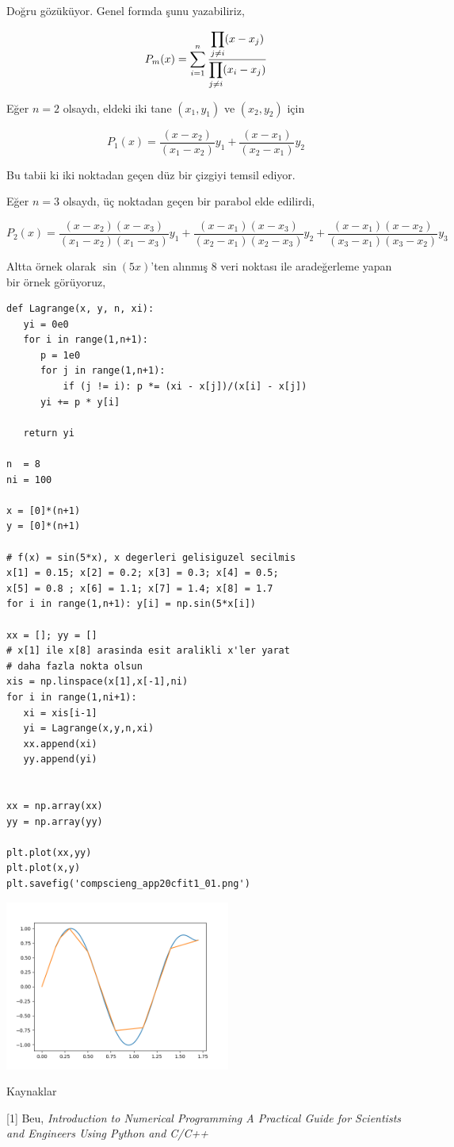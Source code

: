 \documentclass[12pt,fleqn]{article}\usepackage{../../common}
\begin{document}
Doğru gözüküyor. Genel formda şunu yazabiliriz,

$$
P_m (x) = \sum_{i=1}^{n}
\frac{\displaystyle \prod_{j \ne i} (x - x_j)}{\displaystyle \prod_{j \ne i} (x_i - x_j)}
$$

Eğer $n=2$ olsaydı, eldeki iki tane $(x_1,y_1)$ ve $(x_2,y_2)$ için

$$
P_1(x) =
\frac{(x-x_2)}{(x_1-x_2)} y_1 +
\frac{(x-x_1)}{(x_2-x_1)} y_2 
$$

Bu tabii ki iki noktadan geçen düz bir çizgiyi temsil ediyor.

Eğer $n=3$ olsaydı, üç noktadan geçen bir parabol elde edilirdi,

$$
P_2(x) =
\frac{(x-x_2)(x-x_3)}{(x_1-x_2)(x_1-x_3)} y_1 +
\frac{(x-x_1)(x-x_3)}{(x_2-x_1)(x_2-x_3)} y_2 +
\frac{(x-x_1)(x-x_2)}{(x_3-x_1)(x_3-x_2)} y_3
$$

Altta örnek olarak $\sin(5x)$'ten alınmış 8 veri noktası ile
aradeğerleme yapan bir örnek görüyoruz,

\begin{verbatim}
def Lagrange(x, y, n, xi):
   yi = 0e0
   for i in range(1,n+1):
      p = 1e0
      for j in range(1,n+1):
          if (j != i): p *= (xi - x[j])/(x[i] - x[j])
      yi += p * y[i]

   return yi

n  = 8  
ni = 100

x = [0]*(n+1)                                                   
y = [0]*(n+1)

# f(x) = sin(5*x), x degerleri gelisiguzel secilmis 
x[1] = 0.15; x[2] = 0.2; x[3] = 0.3; x[4] = 0.5;
x[5] = 0.8 ; x[6] = 1.1; x[7] = 1.4; x[8] = 1.7
for i in range(1,n+1): y[i] = np.sin(5*x[i])

xx = []; yy = []
# x[1] ile x[8] arasinda esit aralikli x'ler yarat
# daha fazla nokta olsun
xis = np.linspace(x[1],x[-1],ni)
for i in range(1,ni+1):
   xi = xis[i-1]
   yi = Lagrange(x,y,n,xi) 
   xx.append(xi)
   yy.append(yi)


xx = np.array(xx)
yy = np.array(yy)

plt.plot(xx,yy)
plt.plot(x,y)
plt.savefig('compscieng_app20cfit1_01.png')
\end{verbatim}

\includegraphics[width=20em]{compscieng_app20cfit1_01.png}

Kaynaklar

[1] Beu, {\em Introduction to Numerical Programming A Practical Guide for Scientists and Engineers Using Python and C/C++}
\end{document}

